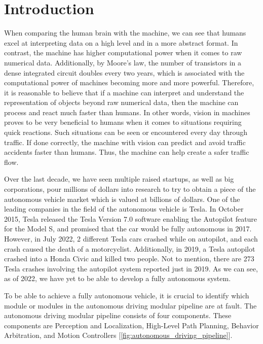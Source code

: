 \chapter{Introduction} \label{sec:introduction}

When comparing the human brain with the machine, we can see that humans excel at interpreting data on a high level and in a more abstract format. In contrast, the machine has higher computational power when it comes to raw numerical data. Additionally, by Moore's law, the number of transistors in a dense integrated circuit doubles every two years, which is associated with the computational power of machines becoming more and more powerful. Therefore, it is reasonable to believe that if a machine can interpret and understand the representation of objects beyond raw numerical data, then the machine can process and react much faster than humans. In other words, vision in machines proves to be very beneficial to humans when it comes to situations requiring quick reactions. Such situations can be seen or encountered every day through traffic. If done correctly, the machine with vision can predict and avoid traffic accidents faster than humans. Thus, the machine can help create a safer traffic flow.

Over the last decade, we have seen multiple raised startups, as well as big corporations, pour millions of dollars into research to try to obtain a piece of the autonomous vehicle market which is valued at billions of dollars. One of the leading companies in the field of the autonomous vehicle is Tesla. In October 2015, Tesla released the Tesla Version 7.0 software enabling the Autopilot feature for the Model S, and promised that the car would be fully autonomous in 2017. However, in July 2022, 2 different Tesla cars crashed while on autopilot, and each crash caused the death of a motorcyclist. Additionally, in 2019, a Tesla autopilot crashed into a Honda Civic and killed two people. Not to mention, there are 273 Tesla crashes involving the autopilot system reported just in 2019. As we can see, as of 2022, we have yet to be able to develop a fully autonomous system.

To be able to achieve a fully autonomous vehicle, it is crucial to identify which module or modules in the autonomous driving modular pipeline are at fault. The autonomous driving modular pipeline consists of four components. These components are Perception and Localization, High-Level Path Planning, Behavior Arbitration, and Motion Controllers [\ref{fig:autonomous_driving_pipeline}].


